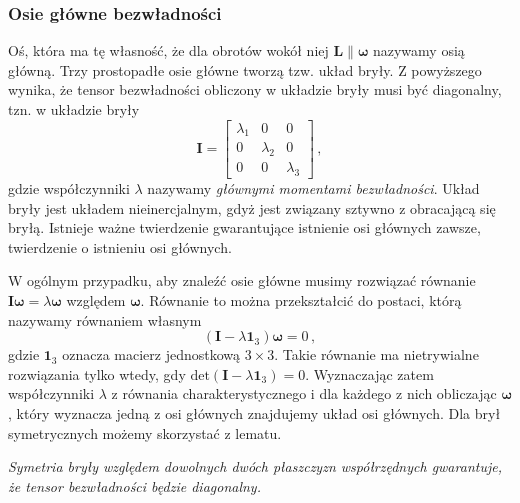\documentclass[../main.tex]{subfiles}
\begin{document}
\subsubsection{Osie główne bezwładności}
Oś, która ma tę własność, że dla obrotów wokół niej \(\mathbf{L}\parallel\boldsymbol{\omega}\) nazywamy osią główną. Trzy prostopadłe osie główne tworzą tzw. układ bryły. Z powyższego wynika, że tensor bezwładności obliczony w układzie bryły musi być diagonalny, tzn. w układzie bryły
\begin{equation*}
    \mathbf{I}=\begin{bmatrix}\lambda_1&0&0\\0&\lambda_2&0\\0&0&\lambda_3 \end{bmatrix}\,,
\end{equation*}
gdzie współczynniki \(\lambda\) nazywamy \textit{głównymi momentami bezwładności}. Układ bryły jest układem nieinercjalnym, gdyż jest związany sztywno z obracającą się bryłą. Istnieje ważne twierdzenie gwarantujące istnienie osi głównych zawsze, twierdzenie o istnieniu osi głównych.
\medskip

\noindent{}
\medskip

W ogólnym przypadku, aby znaleźć osie główne musimy rozwiązać równanie \(\mathbf{I}\boldsymbol{\omega}=\lambda\boldsymbol{\omega}\) względem \(\boldsymbol{\omega}\). Równanie to można przekształcić do postaci, którą nazywamy równaniem własnym
\begin{equation*}
    (\mathbf{I}-\lambda\mathbf{1}_3)\boldsymbol{\omega}=0\,,
\end{equation*}
gdzie \(\mathbf{1}_3\) oznacza macierz jednostkową \(3\times3\). Takie równanie ma nietrywialne rozwiązania tylko wtedy, gdy \(\text{det}(\mathbf{I}-\lambda\mathbf{1}_3)=0\). Wyznaczając zatem współczynniki \(\lambda\) z równania charakterystycznego i dla każdego z nich obliczając \(\boldsymbol{\omega}\), który wyznacza jedną z osi głównych znajdujemy układ osi głównych. Dla brył symetrycznych możemy skorzystać z lematu.
\medskip

\textit{Symetria bryły względem dowolnych dwóch płaszczyzn współrzędnych gwarantuje, że tensor bezwładności będzie diagonalny.}
\end{document}
